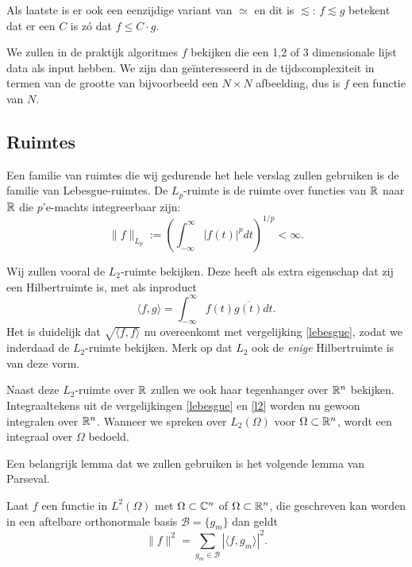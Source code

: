 Als laatste is er ook een eenzijdige variant van $\simeq$ en dit is $\lesssim$: $f \lesssim g$ betekent dat er een $C$ is z\'o dat $f \leq C \cdot g$.

We zullen in de praktijk algoritmes $f$ bekijken die een 1,2 of 3 dimensionale lijst data als input hebben.
We zijn dan ge\"interesseerd in de tijdscomplexiteit in termen van de grootte van bijvoorbeeld een $N\times N$ 
afbeelding, dus is $f$ een functie van $N$.

\subsection{Ruimtes}
\label{ruimtes}
Een familie van ruimtes die wij gedurende het hele verslag zullen gebruiken is de familie van Lebesgue-ruimtes. De $L_p$-ruimte is de ruimte over functies van $\mathbb{R}$ naar $\mathbb{R}$ die $p$'e-machts integreerbaar zijn:
\begin{equation}
	\label{lebesgue}
	\| f \|_{L_p} := \left(\int_{-\infty}^\infty |f(t)|^p dt\right)^{1/p} < \infty.
\end{equation}

Wij zullen vooral de $L_2$-ruimte bekijken. Deze heeft als extra eigenschap dat zij een Hilbertruimte is, met als inproduct
\begin{equation}
	\label{l2}
	\langle f, g \rangle = \int_{-\infty}^\infty f(t) \overline{g(t)} dt.
\end{equation}
Het is duidelijk dat $\sqrt{\langle f, f \rangle}$ nu overeenkomt met vergelijking \ref{lebesgue}, zodat we inderdaad de $L_2$-ruimte bekijken. Merk op dat $L_2$ ook de \emph{enige} Hilbertruimte is van deze vorm.

Naast deze $L_2$-ruimte over $\mathbb{R}$ zullen we ook haar tegenhanger over $\mathbb{R}^n$ bekijken. Integraaltekens uit de vergelijkingen \ref{lebesgue} en \ref{l2} worden nu gewoon integralen over $\mathbb{R}^n$. Wanneer we spreken over $L_2(\Omega)$ voor $\Omega \subset \mathbb{R}^n$, wordt een integraal over $\Omega$ bedoeld.

Een belangrijk lemma dat we zullen gebruiken is het volgende lemma van Parseval.
\begin{lemm}
  \label{parseval}
  Laat $f$ een functie in $L^2(\Omega)$ met $\Omega \subset \mathbb{C}^n$ of $\Omega\subset\mathbb{R}^n$, die geschreven kan worden in een aftelbare 
  orthonormale basis $\mathcal{B}=\{g_m\}$ dan geldt
  \[
  \|f\|^2 = \sum_{g_m\in\mathcal{B}} | \langle f, g_m \rangle |^2.
  \]
\end{lemm}


